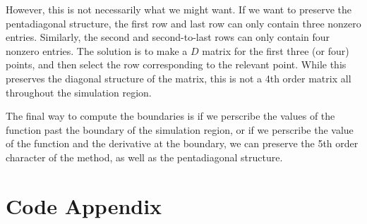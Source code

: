 \documentclass{article}
\begin{document}
However, this is not necessarily what we might want.
If we want to preserve the pentadiagonal structure, the first row
	and last row can only contain three nonzero entries.
Similarly, the second and second-to-last rows can only contain four
	nonzero entries.
The solution is to make a $D$ matrix for the first three (or four)
	points, and then select the row corresponding to the relevant point.
While this preserves the diagonal structure of the matrix, this is not
	a  4th order matrix all throughout the simulation region.

The final way to compute the boundaries is if we perscribe the values 
	of the function past the boundary of the simulation region,
	or if we perscribe the value of the function and the derivative
	at the boundary, we can preserve the 5th order character
	of the method, as well as the pentadiagonal structure.

\appendix
\section{Code Appendix}
\lstset{language=python}

\end{document}
